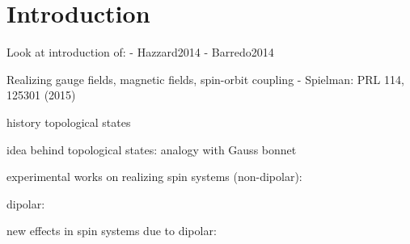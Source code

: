 \chapter*{Introduction}

Look at introduction of:
- Hazzard2014
- Barredo2014

Realizing gauge fields, magnetic fields, spin-orbit coupling
- Spielman: PRL 114, 125301 (2015)

history topological states

idea behind topological states: analogy with Gauss bonnet

experimental works on realizing spin systems (non-dipolar):~\cite{Fukuhara2013,Simon2011}

dipolar:~\cite{DePaz2013}

new effects in spin systems due to dipolar:~\cite{Avellino2006,Hauke2010,Peter2012b,Hazzard2014}

